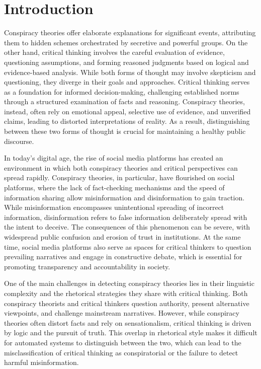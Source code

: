 \documentclass{Configuration_Files/PoliMi3i_thesis}
\begin{document}
\mainmatter %

\chapter{Introduction}
Conspiracy theories offer elaborate explanations for significant events, attributing them to hidden schemes orchestrated by secretive and powerful groups. On the other hand, critical thinking involves the careful evaluation of evidence, questioning assumptions, and forming reasoned judgments based on logical and evidence-based analysis. While both forms of thought may involve skepticism and questioning, they diverge in their goals and approaches. Critical thinking serves as a foundation for informed decision-making, challenging established norms through a structured examination of facts and reasoning. Conspiracy theories, instead, often rely on emotional appeal, selective use of evidence, and unverified claims, leading to distorted interpretations of reality. As a result, distinguishing between these two forms of thought is crucial for maintaining a healthy public discourse.

In today’s digital age, the rise of social media platforms has created an environment in which both conspiracy theories and critical perspectives can spread rapidly. Conspiracy theories, in particular, have flourished on social platforms, where the lack of fact-checking mechanisms and the speed of information sharing allow misinformation and disinformation to gain traction. While misinformation encompasses unintentional spreading of incorrect information, disinformation refers to false information deliberately spread with the intent to deceive. The consequences of this phenomenon can be severe, with widespread public confusion and erosion of trust in institutions. At the same time, social media platforms also serve as spaces for critical thinkers to question prevailing narratives and engage in constructive debate, which is essential for promoting transparency and accountability in society.

One of the main challenges in detecting conspiracy theories lies in their linguistic complexity and the rhetorical strategies they share with critical thinking. Both conspiracy theorists and critical thinkers question authority, present alternative viewpoints, and challenge mainstream narratives. However, while conspiracy theories often distort facts and rely on sensationalism, critical thinking is driven by logic and the pursuit of truth. This overlap in rhetorical style makes it difficult for automated systems to distinguish between the two, which can lead to the misclassification of critical thinking as conspiratorial or the failure to detect harmful misinformation. 
\end{document}
